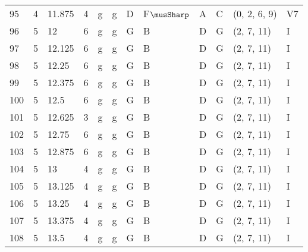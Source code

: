 \begin{tabular}{llllllllllll}
95  & 4       & 11.875 & 4               & g          & g              & D      & F$\musSharp$      & A      & C         & (0, 2, 6, 9)     & V7             \\
96  & 5       & 12     & 6               & g          & g              & G      & B       & D      & G         & (2, 7, 11)       & I              \\
97  & 5       & 12.125 & 6               & g          & g              & G      & B       & D      & G         & (2, 7, 11)       & I              \\
98  & 5       & 12.25  & 6               & g          & g              & G      & B       & D      & G         & (2, 7, 11)       & I              \\
99  & 5       & 12.375 & 6               & g          & g              & G      & B       & D      & G         & (2, 7, 11)       & I              \\
100 & 5       & 12.5   & 6               & g          & g              & G      & B       & D      & G         & (2, 7, 11)       & I              \\
101 & 5       & 12.625 & 3               & g          & g              & G      & B       & D      & G         & (2, 7, 11)       & I              \\
102 & 5       & 12.75  & 6               & g          & g              & G      & B       & D      & G         & (2, 7, 11)       & I              \\
103 & 5       & 12.875 & 6               & g          & g              & G      & B       & D      & G         & (2, 7, 11)       & I              \\
104 & 5       & 13     & 4               & g          & g              & G      & B       & D      & G         & (2, 7, 11)       & I              \\
105 & 5       & 13.125 & 4               & g          & g              & G      & B       & D      & G         & (2, 7, 11)       & I              \\
106 & 5       & 13.25  & 4               & g          & g              & G      & B       & D      & G         & (2, 7, 11)       & I              \\
107 & 5       & 13.375 & 4               & g          & g              & G      & B       & D      & G         & (2, 7, 11)       & I              \\
108 & 5       & 13.5   & 4               & g          & g              & G      & B       & D      & G         & (2, 7, 11)       & I              \\

\end{tabular}
